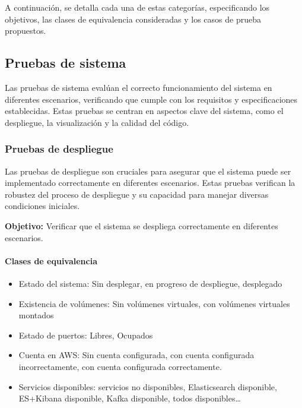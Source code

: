 A continuación, se detalla cada una de estas categorías, especificando los
objetivos, las clases de equivalencia consideradas y los casos de prueba
propuestos.


\newpage{}
\subsection{Pruebas de sistema}
Las pruebas de sistema evalúan el correcto funcionamiento del sistema en
diferentes escenarios, verificando que cumple con los requisitos y
especificaciones establecidas. Estas pruebas se centran en aspectos clave del
sistema, como el despliegue, la visualización y la calidad del código.

\subsubsection{Pruebas de despliegue}
Las pruebas de despliegue son cruciales para asegurar que el sistema puede ser
implementado correctamente en diferentes escenarios. Estas pruebas verifican
la robustez del proceso de despliegue y su capacidad para manejar diversas
condiciones iniciales.

\textbf{Objetivo:} Verificar que el sistema se despliega correctamente en
diferentes escenarios.

\paragraph{Clases de equivalencia}
\begin{itemize}
    \item Estado del sistema: Sin desplegar, en progreso de despliegue,
		desplegado
    \item Existencia de volúmenes: Sin volúmenes virtuales, con volúmenes
		virtuales montados
    \item Estado de puertos: Libres, Ocupados
    \item Cuenta en AWS: Sin cuenta configurada, con cuenta configurada
        incorrectamente, con cuenta configurada correctamente.
    \item Servicios disponibles: servicios no disponibles, Elasticsearch disponible,
        ES+Kibana disponible, Kafka disponible, todos disponibles\ldots
\end{itemize}


